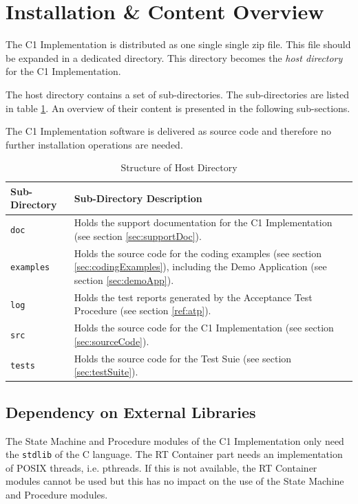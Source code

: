 \documentclass[a4paper,10pt]{article}
\let\stdsection\section
\renewcommand\section{\newpage\stdsection}
\begin{document}
\section{Installation \& Content Overview}
The C1 Implementation is distributed as one single single zip file. This file should be expanded in a dedicated directory. This directory becomes the \emph{host directory} for the C1 Implementation.

The host directory contains a set of sub-directories. The sub-directories are listed in table \ref{tab:hostdir}. An overview of their content is presented in the following sub-sections. 

The C1 Implementation software is delivered as source code and therefore no further installation operations are needed.

\begin{longtable}{|l|p{8.7cm}|}
\caption{Structure of Host Directory}\label{tab:hostdir} \\
\hline
\rowcolor{gray}
\textbf{Sub-Directory} & \textbf{Sub-Directory Description}\\
\hline\hline
\texttt{doc} & Holds the support documentation for the C1 Implementation (see section \ref{sec:supportDoc}).\\
\hline
\texttt{examples} & Holds the source code for the coding examples (see section \ref{sec:codingExamples}), including the Demo Application (see section \ref{sec:demoApp}).\\
\hline
\texttt{log} & Holds the test reports generated by the Acceptance Test Procedure (see section \ref{ref:atp}).\\
\hline
\texttt{src} & Holds the source code for the C1 Implementation (see section \ref{sec:sourceCode}).\\
\hline
\texttt{tests} & Holds the source code for the Test Suie (see section \ref{sec:testSuite}).\\
\hline
\end{longtable}

\subsection{Dependency on External Libraries}\label{sec:DepExtLib}
The State Machine and Procedure modules of the C1 Implementation only need the \texttt{stdlib} of the C language. The RT Container part needs an implementation of POSIX threads, i.e. pthreads. If this is not available, the RT Container modules cannot be used but this has no impact on the use of the State Machine and Procedure modules.
\end{document}
